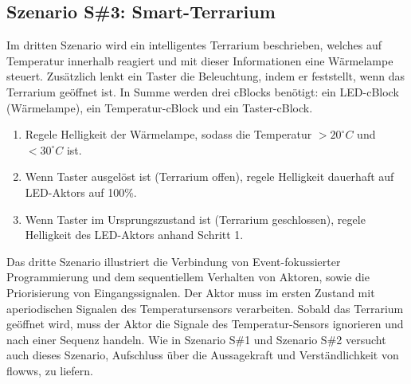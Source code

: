 \subsection{Szenario S\#3: Smart-Terrarium}
Im dritten  Szenario wird ein intelligentes Terrarium beschrieben, welches auf Temperatur innerhalb reagiert und mit dieser Informationen eine Wärmelampe steuert. Zusätzlich lenkt ein Taster die Beleuchtung, indem er feststellt, wenn das Terrarium geöffnet ist. In Summe werden drei cBlocks benötigt: ein LED-cBlock (Wärmelampe), ein Temperatur-cBlock und ein Taster-cBlock.
\begin{enumerate}
    \item Regele Helligkeit der Wärmelampe, sodass die Temperatur  $>20^{\circ}C$ und $<30^{\circ}C$ ist.
    \item Wenn Taster ausgelöst ist (Terrarium offen), regele Helligkeit dauerhaft auf LED-Aktors auf 100\%.
    \item Wenn Taster im Ursprungszustand ist (Terrarium geschlossen), regele Helligkeit des LED-Aktors anhand Schritt 1.
\end{enumerate}
Das dritte Szenario illustriert die Verbindung von Event-fokussierter Programmierung und dem sequentiellem Verhalten von Aktoren, sowie die Priorisierung von Eingangssignalen. Der Aktor muss im ersten Zustand mit aperiodischen Signalen des Temperatursensors verarbeiten. Sobald das Terrarium geöffnet wird, muss der Aktor die Signale des Temperatur-Sensors ignorieren und nach einer Sequenz handeln. Wie in Szenario S\#1 und Szenario S\#2 versucht auch dieses Szenario, Aufschluss über die Aussagekraft und Verständlichkeit von flowws, zu liefern.